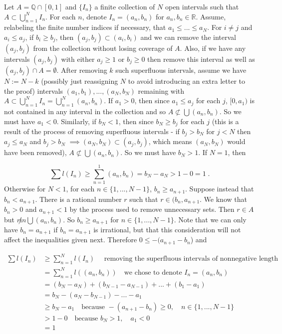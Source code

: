 \documentclass[a4paper]{article}
\begin{document}
Let $A = \mathbb{Q}\cap [0,1]$ and $\{I_n\}$ a finite collection of $N$ open intervals such that $A\subset \bigcup_{n=1}^N I_n$. For each $n$, denote $I_n = (a_n,b_n)$ for $a_n,b_n \in \mathbb{R}$. Assume, relabeling the finite number indices if necessary, that $a_1 \leq ... \leq a_N$. For $i\neq j$ and $a_i \leq a_j$, if $b_i \geq b_j$, then $(a_j,b_j) \subset (a_i,b_i)$ and we can remove the interval $(a_j,b_j)$ from the collection without losing coverage of $A$. Also, if we have any intervals $(a_j,b_j)$ with either $a_j \geq 1$ or $b_j \geq 0$ then remove this interval as well as $(a_j,b_j) \cap A = \emptyset$. After removing $k$ such superfluous intervals, assume we have $N := N-k$ (possibly just reassigning $N$ to avoid introducing an extra letter to the proof) intervals $(a_1,b_1),...,(a_N,b_N)$ remaining with $A \subset \bigcup_{n = 1}^N I_n = \bigcup_{n =1}^N (a_n,b_n)$. If $a_1> 0 $, then since $a_1\leq a_j$ for each $j$, $[0,a_1)$ is not contained in any interval in the collection and so $A \not\subset \bigcup (a_n,b_n)$. So we must have $a_1 < 0$. Similarly, if $b_N < 1$, then since $b_N \geq b_j$ for each $j$ (this is a result of the process of removing superfluous intervals - if $b_j > b_N$ for $j < N$ then $a_j \leq a_N$ and $b_j > b_N$ $\implies (a_N,b_N) \subset (a_j, b_j)$, which means $(a_N,b_N)$ would have been removed), $A \not\subset \bigcup (a_n,b_n)$. So we must have $b_N > 1$.  If $N=1$, then

$$\sum l(I_n) \geq \sum_{n=1}^1 (a_n,b_n) = b_N - a_N > 1-0 = 1 \;.$$
Otherwise for $N < 1$, for each $n \in \{1,...,N-1\}$, $b_n \geq a_{n+1}$. Suppose instead that $b_n < a_{n+1}$. There is a rational number $r$ such that $r \in (b_n,a_{n+1}$. We know that $b_n > 0$ and $a_{n+1} < 1$ by the process used to remove unnecessary sets. Then $r \in A$ but $r \not in \bigcup (a_n,b_n)$. So $b_n \geq a_{n+1}$ for $n \in \{1,...,N-1\}$. Note that we can only have $b_n = a_{n+1}$ if $b_n = a_{n+1}$ is irrational, but that this consideration will not affect the inequalities given next. Therefore $0\leq  -(a_{n+1} - b_n$) and

\begin{align*}
\sum l(I_n) & \geq \sum_{n=1}^N l(I_n) \quad \text{ removing the superfluous intervals of nonnegative length}\\
&= \sum_{n=1}^N l((a_n,b_n)) \quad \text{we chose to denote } I_n = (a_n,b_n)\\
&= (b_N - a_N) + (b_{N-1} -a_{N-1}) + ... + (b_1 - a_1)\\
&= b_N - (a_{N}-b_{N-1}) - ... - a_1 \\
&\geq b_N - a_1 \quad \text{because } -(a_{n+1} - b_n) \geq 0,\quad  n \in \{1,...,N-1\}\\
&> 1 - 0 \quad \text{because } b_N > 1, \quad a_1 < 0\\
&= 1
\end{align*}
\end{document}
